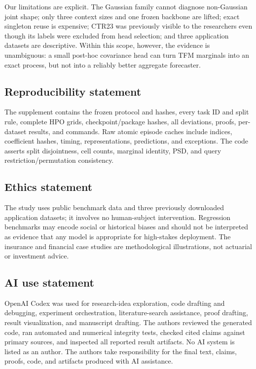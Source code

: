 \documentclass{article}
\begin{document}
Our limitations are explicit.  The Gaussian family cannot diagnose
non-Gaussian joint shape; only three context sizes and one frozen backbone are
lifted; exact singleton reuse is expensive; CTR23 was previously visible to
the researchers even though its labels were excluded from head selection; and
three application datasets are descriptive.  Within this scope, however, the
evidence is unambiguous: a small post-hoc covariance head can turn TFM
marginals into an exact process, but not into a reliably better aggregate
forecaster.

\subsection*{Reproducibility statement}
The supplement contains the frozen protocol and hashes, every task ID and
split rule, complete HPO grids, checkpoint/package hashes, all deviations,
proofs, per-dataset results, and commands.  Raw atomic episode caches include
indices, coefficient hashes, timing, representations, predictions, and
exceptions.  The code asserts split disjointness, cell counts, marginal
identity, PSD, and query restriction/permutation consistency.

\subsection*{Ethics statement}
The study uses public benchmark data and three previously downloaded
application datasets; it involves no human-subject intervention.  Regression
benchmarks may encode social or historical biases and should not be interpreted
as evidence that any model is appropriate for high-stakes deployment.  The
insurance and financial case studies are methodological illustrations, not
actuarial or investment advice.

\subsection*{AI use statement}
OpenAI Codex was used for research-idea exploration, code drafting and
debugging, experiment orchestration, literature-search assistance, proof
drafting, result visualization, and manuscript drafting.  The authors reviewed
the generated code, ran automated and numerical integrity tests, checked cited
claims against primary sources, and inspected all reported result artifacts.
No AI system is listed as an author.  The authors take responsibility for the
final text, claims, proofs, code, and artifacts produced with AI assistance.

\label{page:main-end}




\appendix

\end{document}
